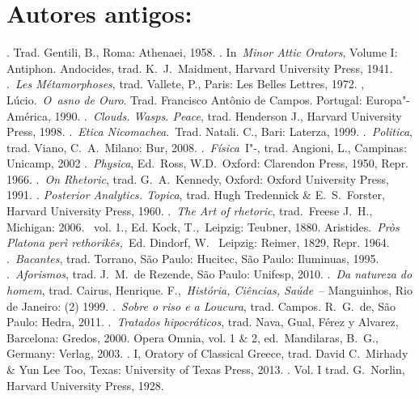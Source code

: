  

\section{Autores antigos:}

 

\begin{bibliohedra}
. Trad. Gentili, B., Roma: Athenaei, 1958.
. In~\emph{Minor Attic Orators}, Volume I: Antiphon.
  Andocides, trad. K.~J.~Maidment, Harvard University Press, 1941.
.~\emph{Les Métamorphoses}, trad. Vallete, P., Paris: Les Belles
  Lettres, 1972.
, Lúcio.~\emph{O~asno de Ouro}. Trad. Francisco Antônio de
  Campos. Portugal: Europa"-América, 1990.
.~\emph{Clouds. Wasps. Peace}, trad. Henderson J., Harvard
  University Press, 1998.
.~\emph{Etica Nicomachea}.~Trad. Natali. C., Bari: Laterza,
  1999.
.~\emph{Politica}, trad. Viano, C.~A.~Milano: Bur, 2008.
.~\emph{Física}~I"-, trad. Angioni, L., Campinas: Unicamp,
  2002
.~\emph{Physica}, Ed.~Ross, W.D.~Oxford: Clarendon Press,
  1950, Repr. 1966.
.~\emph{On Rhetoric}, trad. G.~A.~Kennedy, Oxford: Oxford
  University Press, 1991.
\emph{. Posterior Analytics. Topica}, trad. Hugh Tredennick
  \& E.~S.~Forster, Harvard University Press, 1960.
.~\emph{The Art of rhetoric}, trad.~Freese J.~H., Michigan:
  2006.
~vol. 1., Ed. Kock,
  T\emph{.,~}Leipzig: Teubner, 1880.
 Aristides.~\emph{Pròs Platona perì rethorikês,~}Ed. Dindorf, W.~  Leipzig: Reimer, 1829, Repr. 1964.
.~\emph{Bacantes}, trad.  Torrano, São Paulo: Hucitec,
  São Paulo: Iluminuas, 1995.
.~\emph{Aforismos}, trad. J.~M.~de Rezende, São Paulo:
  Unifesp, 2010.
.~\emph{Da natureza do homem}, trad. Cairus, Henrique.
  F.,~\emph{História, Ciências, Saúde}~-- Manguinhos, Rio de Janeiro: 
  (2) 1999.
.~\emph{Sobre o riso e a Loucura}, trad. Campos. R.~G.~de,
  São Paulo: Hedra, 2011.
.~\emph{Tratados hipocráticos}, trad. Nava, Gual, Férez y
  Alvarez, Barcelona: Gredos, 2000.
 Opera Omnia, vol. 1 \& 2, ed.~Mandilaras, B.~G., Germany:
  Verlag, 2003.
. I, Oratory of Classical Greece, trad. David C.~Mirhady \&
  Yun Lee Too, Texas: University of Texas Press, 2013.
. Vol. I trad. G.~Norlin, Harvard University Press, 1928.

\end{bibliohedra}
